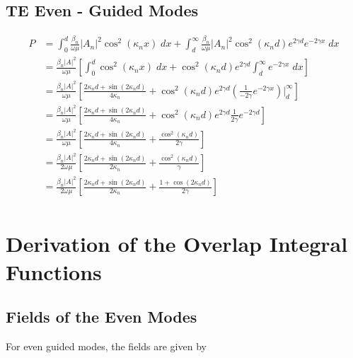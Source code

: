 \documentclass[11pt, oneside]{article}   	%
\begin{document}
\subsection{TE Even - Guided Modes}

\begin{align*}
P &= \int_{0}^{d} \frac{\beta_{n}}{\omega \mu} |A_{n}|^{2} \cos^{2}(\kappa_{n} x) \; dx + \int_{d}^{\infty} \frac{\beta_{n}}{\omega \mu} |A_{n}|^{2} \cos^{2}(\kappa_{n}d) e^{2 \gamma d} e^{-2 \gamma x} \; dx \\
&= \frac{\beta_{n} |A|^{2}}{\omega \mu} \left[ \int_{0}^{d} \cos^{2}(\kappa_{n} x) \; dx + \cos^{2}(\kappa_{n}d) e^{2 \gamma d} \int_{d}^{\infty} e^{-2 \gamma x} \; dx \right] \\
&= \frac{\beta_{n} |A|^{2}}{\omega \mu} \left[  \frac{2\kappa_{n} d + \sin(2\kappa_{n} d)}{4\kappa_{n}} + \cos^{2}(\kappa_{n}d) e^{2 \gamma d} \left( \frac{1}{-2 \gamma} e^{-2 \gamma x}\right) \bigg|_{d}^{\infty} \right] \\
&= \frac{\beta_{n} |A|^{2}}{\omega \mu} \left[  \frac{2\kappa_{n} d + \sin(2\kappa_{n} d)}{4\kappa_{n}} + \cos^{2}(\kappa_{n}d) e^{2 \gamma d} \frac{1}{2 \gamma} e^{-2 \gamma d} \right] \\
&= \frac{\beta_{n} |A|^{2}}{\omega \mu} \left[  \frac{2\kappa_{n} d + \sin(2\kappa_{n} d)}{4\kappa_{n} } + \frac{\cos^{2}(\kappa_{n}d)}{2 \gamma} \right] \\
&= \frac{\beta_{n} |A|^{2}}{2 \omega \mu} \left[  \frac{2\kappa_{n} d + \sin(2\kappa_{n} d)}{2\kappa_{n} } + \frac{\cos^{2}(\kappa_{n}d)}{ \gamma} \right] \\
&= \frac{\beta_{n} |A|^{2}}{2 \omega \mu} \left[  \frac{2\kappa_{n} d + \sin(2\kappa_{n} d)}{2\kappa_{n} } + \frac{1 + \cos(2 \kappa_{n}d)}{2 \gamma} \right] \\
\end{align*}


\newpage

\section{Derivation of the Overlap Integral Functions}

\subsection{Fields of the Even Modes}

For even guided modes, the fields are given by 
\end{document}

